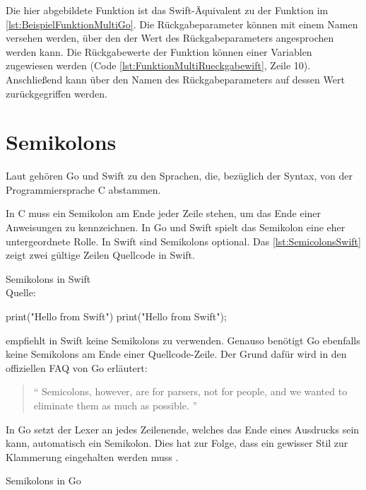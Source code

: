 Die hier abgebildete Funktion ist das Swift-Äquivalent zu der Funktion im \autoref{lst:BeispielFunktionMultiGo}. 
Die Rückgabeparameter können mit einem Namen versehen werden, über den der Wert des Rückgabeparameters angesprochen werden kann. 
Die Rückgabewerte der Funktion können einer Variablen zugewiesen werden (Code \ref{lst:FunktionMultiRueckgabewift}, Zeile 10).
Anschließend kann über den Namen des Rückgabeparameters auf dessen Wert zurückgegriffen werden. 

\section{Semikolons}
\label{sec:Semikolons}
Laut \cite{Wikipedia.ListProgrammingLanguages} gehören Go und Swift zu den Sprachen, die, bezüglich der Syntax, von der Programmiersprache C abstammen.

In C muss ein Semikolon am Ende jeder Zeile stehen, um das Ende einer Anweisungen zu kennzeichnen.
In Go und Swift spielt das Semikolon eine eher untergeordnete Rolle.
In Swift sind Semikolons optional. 
Das \autoref{lst:SemicolonsSwift} zeigt zwei gültige Zeilen Quellcode in Swift.

\begin{listing}[H]
\caption{Semikolons in Swift \\ Quelle:\cite[S.15]{Hoffman.2017}}
\label{lst:SemicolonsSwift}
\begin{SwiftCode}
print("Hello from Swift")
print("Hello from Swift");
\end{SwiftCode}
\end{listing}

\cite{Hoffman.2017} empfiehlt in Swift keine Semikolons zu verwenden. 
Genauso benötigt Go ebenfalls keine Semikolons am Ende einer Quellcode-Zeile. 
Der Grund dafür wird in den offiziellen FAQ von Go erläutert:

\begin{quote}
\enquote{
Semicolons, however, are for parsers, not for people, and we wanted to eliminate them as much as possible.
}\cite{Golang.FAQ}
\end{quote}

In Go setzt der Lexer an jedes Zeilenende, welches das Ende eines Ausdrucks sein kann, automatisch ein Semikolon. 
Dies hat zur Folge, dass ein gewisser Stil zur Klammerung eingehalten werden muss \cite{Golang.FAQ}.

\begin{listing}[H]
\caption{Semikolons in Go}
\label{lst:SemicolonGo}
\begin{GoCode}
package main

func add(a int, b int) (int){
    return a + b
}

func sub(a int, b int) (int)
{
    return a - b
}
//Compiler-Ausgabe: 
//main.go:8: syntax error: unexpected semicolon or newline before {
//Gofmt-Ausgabe:
//8:1: expected declaration, found '{'
\end{GoCode}
\end{listing}


